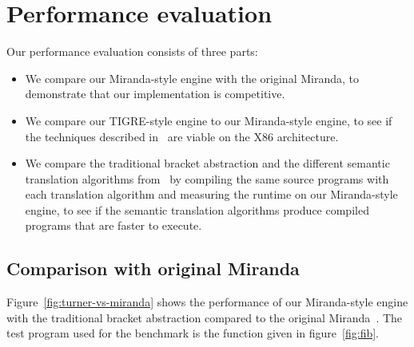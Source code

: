 \documentclass[conference]{IEEEtran}
\begin{document}

\section{Performance evaluation}
\label{sec:eval}
Our performance evaluation consists of three parts:
\begin{itemize}
    \item We compare our Miranda-style engine with the original Miranda, to demonstrate that our implementation is competitive.
    \item We compare our TIGRE-style engine to our Miranda-style engine, to see if the techniques described in~\cite{koopman_fresh_1989} are viable on the X86 architecture.
    \item We compare the traditional bracket abstraction and the different semantic translation algorithms from~\cite{kiselyov_lambda_2018} by compiling the same source programs with each translation algorithm and measuring the runtime on our Miranda-style engine, to see if the semantic translation algorithms produce compiled programs that are faster to execute.
\end{itemize}

\subsection{Comparison with original Miranda}
Figure~\ref{fig:turner-vs-miranda} shows the performance of our Miranda-style engine with the traditional bracket abstraction compared to the original Miranda~\cite{noauthor_open_2021}.
The test program used for the benchmark is the function given in figure~\ref{fig:fib}.
\end{document}
